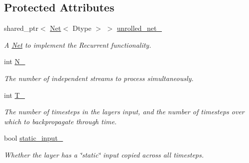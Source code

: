 \subsection*{Protected Attributes}
\begin{DoxyCompactItemize}
\item 
\mbox{\label{classcaffe_1_1_recurrent_layer_a59fcff0e560f96a0b175d601aca1b373}} 
shared\+\_\+ptr$<$ \mbox{\hyperlink{classcaffe_1_1_net}{Net}}$<$ Dtype $>$ $>$ \mbox{\hyperlink{classcaffe_1_1_recurrent_layer_a59fcff0e560f96a0b175d601aca1b373}{unrolled\+\_\+net\+\_\+}}
\begin{DoxyCompactList}\small\item\em A \mbox{\hyperlink{classcaffe_1_1_net}{Net}} to implement the Recurrent functionality. \end{DoxyCompactList}\item 
\mbox{\label{classcaffe_1_1_recurrent_layer_a4bf3c3a87b2a740987aec46e40717907}} 
int \mbox{\hyperlink{classcaffe_1_1_recurrent_layer_a4bf3c3a87b2a740987aec46e40717907}{N\+\_\+}}
\begin{DoxyCompactList}\small\item\em The number of independent streams to process simultaneously. \end{DoxyCompactList}\item 
\mbox{\label{classcaffe_1_1_recurrent_layer_a02f79bca0ccde7543ecf172b328c860f}} 
int \mbox{\hyperlink{classcaffe_1_1_recurrent_layer_a02f79bca0ccde7543ecf172b328c860f}{T\+\_\+}}
\begin{DoxyCompactList}\small\item\em The number of timesteps in the layer\textquotesingle{}s input, and the number of timesteps over which to backpropagate through time. \end{DoxyCompactList}\item 
\mbox{\label{classcaffe_1_1_recurrent_layer_a7da45d2f90a99fe6e4250ffa6a533d97}} 
bool \mbox{\hyperlink{classcaffe_1_1_recurrent_layer_a7da45d2f90a99fe6e4250ffa6a533d97}{static\+\_\+input\+\_\+}}
\begin{DoxyCompactList}\small\item\em Whether the layer has a \char`\"{}static\char`\"{} input copied across all timesteps. \end{DoxyCompactList}\item 

\end{DoxyCompactItemize}
